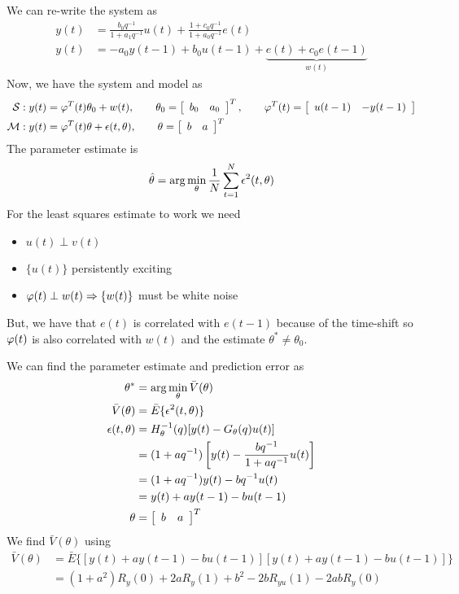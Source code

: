 \begin{example}
We can re-write the system as
\begin{align*}
y(t) &= \frac{b_0q^{-1}}{1+a_1q^{-1}}u(t) + \frac{1+c_0q^{-1}}{1+a_0q^{-1}}e(t) \\
y(t) &= -a_0y(t-1) + b_0u(t-1) + \underbrace{e(t) + c_0e(t-1)}_{w(t)}
\end{align*}
Now, we have the system and model as
\begin{align*}
\mathcal{S}: y(t) &= \varphi^T(t)\theta_0+w(t), \qquad \theta_0=\left[\begin{array}{c c} b_0 & a_0 \end{array}\right]^T, \qquad \varphi^T (t) = \left[\begin{array}{c c} u(t-1) & -y(t-1) \end{array}\right] \\
\mathcal{M}: y (t) &= \varphi^T (t)\theta+\epsilon(t,\theta), \qquad \theta=\left[\begin{array}{c c} b & a\end{array}\right]^T
\end{align*}
The parameter estimate is
$$\hat{\theta} = \arg\min_\theta\frac{1}{N}\sum_{t=1}^N\epsilon^2(t,\theta)$$
For the least squares estimate to work we need
\begin{itemize}
\item $u(t)\perp v(t)$
\item $\{u(t)\}$ persistently exciting
\item $\varphi(t)\perp w(t) \Rightarrow \{w(t)\}$ must be white noise
\end{itemize}
But, we have that $e(t)$ is correlated with $e(t-1)$ because of the time-shift so $\varphi(t)$ is also correlated with $w(t)$ and the estimate $\theta^\ast\neq\theta_0$.

We can find the parameter estimate and prediction error as
\begin{align*}
\theta^\ast &= \arg\min_\theta\bar{V}(\theta) \\
\bar{V}(\theta) &= \bar{E}\{\epsilon^2(t,\theta)\} \\
\epsilon(t,\theta) &= H_\theta^{-1}(q)[y(t)-G_\theta(q)u(t)] \\
&= (1+aq^{-1})\left[y(t) - \frac{bq^{-1}}{1+aq^{-1}}u(t)\right] \\
&= (1+aq^{-1})y(t) - bq^{-1}u(t) \\
&= y(t)+ay(t-1)-bu(t-1) \\
\theta &= \left[\begin{array}{c c} b & a \end{array}\right]^T
\end{align*}
We find $\bar{V}(\theta)$ using
\begin{align*}
\bar{V}(\theta) &= \bar{E}\{[y(t)+ay(t-1)-bu(t-1)][y(t)+ay(t-1)-bu(t-1)]\} \\
&= (1+a^2)R_y(0) + 2aR_y(1) + b^2 - 2bR_{yu}(1) - 2abR_y(0)
\end{align*}


\end{example}
